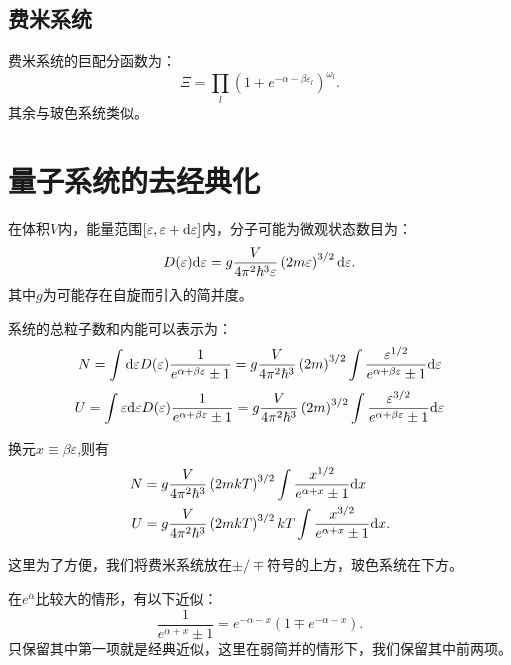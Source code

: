 \subsection{费米系统}
费米系统的巨配分函数为：
\begin{equation}
    \Xi=\prod_l\left(1+e^{-\alpha-\beta\varepsilon_l}\right)^{\omega_l}.
\end{equation}
其余与玻色系统类似。

\section{量子系统的去经典化}
在体积$V$内，能量范围$[\varepsilon,\varepsilon+\mathrm{d} \varepsilon]$内，分子可能为微观状态数目为：
\begin{equation}
D(\varepsilon)\mathrm{d} \varepsilon=g \frac{V}{4\pi^2\hbar^3\varepsilon}\left(2m\varepsilon\right)^{3/2}\mathrm{d}\varepsilon.    
\end{equation}
其中$g$为可能存在自旋而引入的简并度。

系统的总粒子数和内能可以表示为：
\begin{equation}
    N=\int \mathrm{d}\varepsilon D(\varepsilon) \frac{1}{e^{\alpha+\beta\varepsilon}\pm1}=g \frac{V}{4\pi^2\hbar^3}\left(2m\right)^{3/2}\int\frac{\varepsilon^{1/2}}{e^{\alpha+\beta\varepsilon}\pm1} \mathrm{d}\varepsilon
\end{equation}
\begin{equation}
    U=\int \varepsilon\mathrm{d}\varepsilon D(\varepsilon) \frac{1}{e^{\alpha+\beta\varepsilon}\pm1}=g \frac{V}{4\pi^2\hbar^3}\left(2m\right)^{3/2}\int \frac{\varepsilon^{3/2}}{e^{\alpha+\beta\varepsilon}\pm1} \mathrm{d}\varepsilon
\end{equation}

换元$x\equiv \beta\varepsilon$,则有 
\begin{align}
    N&=g \frac{V}{4\pi^2\hbar^3}\left(2mkT\right)^{3/2}\int\frac{x^{1/2}}{e^{\alpha+x}\pm1} \mathrm{d} x\\
    U&=g \frac{V}{4\pi^2\hbar^3}\left(2mkT\right)^{3/2}kT\int\frac{x^{3/2}}{e^{\alpha+x}\pm1} \mathrm{d} x.
\end{align}

这里为了方便，我们将费米系统放在$\pm/\mp$符号的上方，玻色系统在下方。

在$e^{\alpha}$比较大的情形，有以下近似：
\begin{equation}
    \frac{1}{e^{\alpha+x}\pm1}=e^{-\alpha-x}(1\mp e^{-\alpha-x}).
\end{equation}
只保留其中第一项就是经典近似，这里在弱简并的情形下，我们保留其中前两项。


